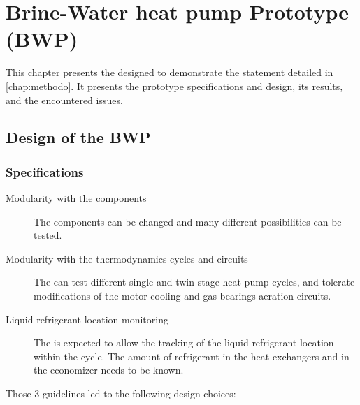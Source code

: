 \chapter{Brine-Water heat pump Prototype (BWP)}
\label{chap:bwp}
\resetallacronyms

\begin{shaded}
  This chapter presents the \BWP{} designed to demonstrate the
  statement detailed in \cref{chap:methodo}. It presents the prototype
  specifications and design, its results, and the encountered issues.
\end{shaded}

\section{Design of the BWP}
\label{sec:bwp-design}

\subsection{Specifications}
\label{sec:bwp-specs}

\begin{description}
\item[Modularity with the components] The \BWP{} components can be
  changed and many different possibilities can be tested.
\item[Modularity with the thermodynamics cycles and circuits] The
  \BWP{} can test different single and twin-stage heat pump cycles,
  and tolerate modifications of the motor cooling and gas bearings
  aeration circuits.
\item[Liquid refrigerant location monitoring] The \BWP{} is expected
  to allow the tracking of the liquid refrigerant location within the
  cycle. The amount of refrigerant in the heat exchangers and in the
  economizer needs to be known.
\end{description}

Those 3 guidelines led to the following design choices:

